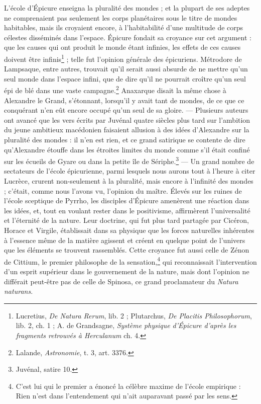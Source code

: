 \documentclass[a4paper, 11pt, oneside]{article}
\begin{document}
L'école d'Épicure enseigna la pluralité des mondes ; et la plupart de ses adeptes ne comprenaient pas seulement les corps planétaires sous le titre de mondes habitables, mais ils croyaient encore, à l'habitabilité d'une multitude de corps célestes disséminés dans l'espace. Épicure fondait sa croyance sur cet argument : que les causes qui ont produit le monde étant infinies, les effets de ces causes doivent être infinis\footnote{Lucretius, \emph{De Natura Rerum}, lib. 2 ; Plutarchus, \emph{De Placitis Philosophorum}, lib. 2, ch. 1 ; A. de Grandsagne, \emph{Système physique d'Épicure d'après les fragments retrouvés à Herculanum} ch. 4.} ; telle fut l'opinion générale des épicuriens. Métrodore de Lampsaque, entre autres, trouvait qu'il serait aussi absurde de ne mettre qu'un seul monde dans l'espace infini, que de dire qu'il ne pourrait croître qu'un seul épi de blé dans une vaste campagne.\footnote{Lalande, \emph{Astronomie}, t. 3, art. 3376.} Anaxarque disait la même chose à Alexandre le Grand, s'étonnant, lorsqu'il y avait tant de mondes, de ce que ce conquérant n'en eût encore occupé qu'un seul de sa gloire. --- Plusieurs auteurs ont avancé que les vers écrits par Juvénal quatre siècles plus tard sur l'ambition du jeune ambitieux macédonien faisaient allusion à des idées d'Alexandre sur la pluralité des mondes : il n'en est rien, et ce grand satirique se contente de dire qu'Alexandre étouffe dans les étroites limites du monde comme s'il était confiné sur les écueils de Gyare ou dans la petite île de Sériphe.\footnote{Juvénal, satire 10.} --- Un grand nombre de sectateurs de l'école épicurienne, parmi lesquels nous aurons tout à l'heure à citer Lucrèce, crurent non-seulement à la pluralité, mais encore à l'infinité des mondes ; c'était, comme nous l'avons vu, l'opinion du maître. Élevés sur les ruines de l'école sceptique de Pyrrho, les disciples d'Épicure amenèrent une réaction dans les idées, et, tout en voulant rester dans le positivisme, affirmèrent l'universalité et l'éternité de la nature. Leur doctrine, qui fut plus tard partagée par Cicéron, Horace et Virgile, établissait dans sa physique que les forces naturelles inhérentes à l'essence même de la matière agissent et créent en quelque point de l'univers que les éléments se trouvent rassemblés. Cette croyance fut aussi celle de Zénon de Cittium, le premier philosophe de la sensation,\footnote{C'est lui qui le premier a énoncé la célèbre maxime de l'école empirique : Rien n'est dans l'entendement qui n'ait auparavant passé par les sens.} qui reconnaissait l'intervention d'un esprit supérieur dans le gouvernement de la nature, mais dont l'opinion ne différait peut-être pas de celle de Spinosa, ce grand proclamateur du \emph{Natura naturans}.
\end{document}
